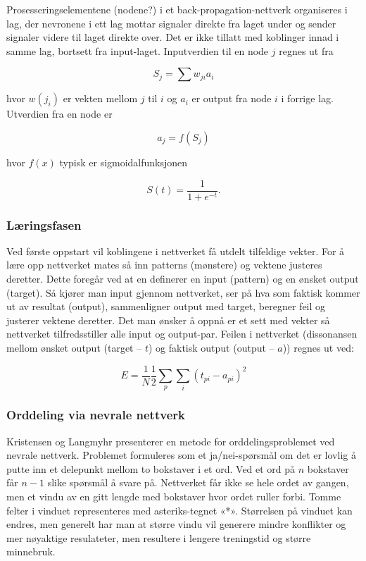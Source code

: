 Prosesseringselementene (nodene?) i et back-propagation-nettverk organiseres i lag, der nevronene i ett lag mottar signaler direkte fra laget under og sender signaler videre til laget direkte over. Det er ikke tillatt med koblinger innad i samme lag, bortsett fra input-laget. Inputverdien til en node $j$ regnes ut fra

\begin{equation}
S_j = \sum w_{ji}a_i
\end{equation}

hvor $w(j_i)$ er vekten mellom $j$ til $i$ og $a_i$ er output fra node $i$ i forrige lag. Utverdien fra en node er

\begin{equation}
a_j = f(S_{j})
\end{equation}

hvor $f(x)$ typisk er sigmoidalfunksjonen

\begin{equation}
S(t) = \frac{1}{1+e^{-t}}.
\end{equation}

\subsubsection{Læringsfasen}

Ved første oppstart vil koblingene i nettverket få utdelt tilfeldige vekter. For å lære opp nettverket mates så inn patterns (mønstere) og vektene justeres deretter. Dette foregår ved at en definerer en input (pattern) og en ønsket output (target). Så kjører man input gjennom nettverket, ser på hva som faktisk kommer ut av resultat (output), sammenligner output med target, beregner feil og justerer vektene deretter. Det man ønsker å oppnå er et sett med vekter så nettverket tilfredsstiller alle input og output-par. Feilen i nettverket (dissonansen mellom ønsket output (target -- $t$) og faktisk output (output -- $a$)) regnes ut ved:

\begin{equation}
E = \frac{1}{N}\frac{1}{2}\sum\limits_{p}\sum\limits_{i}(t_{pi}-a_{pi})^2
\end{equation}

\subsubsection{Orddeling via nevrale nettverk}

Kristensen og Langmyhr \cite{kristensen1998two} presenterer en metode for orddelingsproblemet ved nevrale nettverk. Problemet formuleres som et ja/nei-spørsmål om det er lovlig å putte inn et delepunkt mellom to bokstaver i et ord. Ved et ord på $n$ bokstaver får $n-1$ slike spørsmål å svare på. Nettverket får ikke se hele ordet av gangen, men et vindu av en gitt lengde med bokstaver hvor ordet ruller forbi. Tomme felter i vinduet representeres med asteriks-tegnet «*». Størrelsen på vinduet kan endres, men generelt har man at større vindu vil generere mindre konflikter og mer nøyaktige resulateter, men resultere i lengere treningstid og større minnebruk. 

